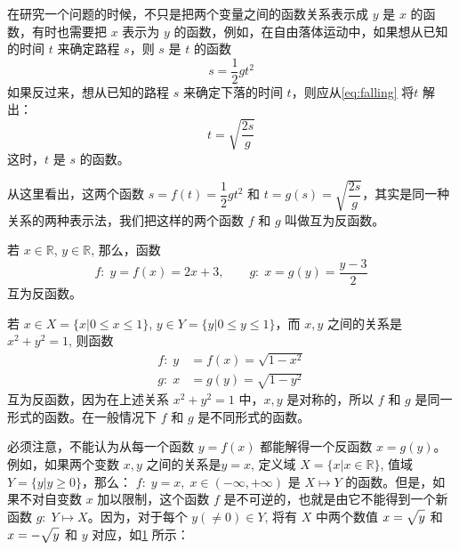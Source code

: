 在研究一个问题的时候，不只是把两个变量之间的函数关系表示成 $y$ 是 $x$ 的函数，有时也需要把 $x$ 表示为 $y$ 的函数，例如，在自由落体运动中，如果想从已知的时间 $t$ 来确定路程 $s$，则 $s$ 是 $t$ 的函数
\begin{equation}
  \label{eq:falling}
  s=\frac{1}{2}gt^2
\end{equation}
如果反过来，想从已知的路程 $s$ 来确定下落的时间 $t$，则应从\cref{eq:falling} 将$t$ 解出：
\begin{equation}
    t=\sqrt{\frac{2s}{g}}
\end{equation}
这时，$t$ 是 $s$ 的函数。

从这里看出，这两个函数 $s=f(t)=\dfrac{1}{2}gt^2$ 和 $t=g(s)=\sqrt{\dfrac{2s}{g}}$，其实是同一种关系的两种表示法，我们把这样的两个函数 $f$ 和 $g$ 叫做互为反函数。

\begin{example}
  若 $x\in\mathbb{R}$, $y\in\mathbb{R}$, 那么，函数
\[f:\; y=f(x)=2x+3,\qquad g:\; x=g(y)=\frac{y-3}{2}\]
互为反函数。
\end{example}


\begin{example}
 若 $x\in X=\{x|0\leqslant x\leqslant 1\}$, $y\in Y=\{y|0\leqslant y\leqslant 1\}$，而 $x,y$ 之间的关系是 $x^2+y^2=1$, 则函数
\[\begin{split}
  f:\; y&=f(x)=\sqrt{1-x^2}\\
g:\; x&=g(y)=\sqrt{1-y^2}   
\end{split}\]
互为反函数，因为在上述关系 $x^2+y^2=1$ 中，$x,y$ 是对称的，所以 $f$ 和 $g$ 是同一形式的函数。在一般情况下 $f$ 和 $g$ 是不同形式的函数。
\end{example}

必须注意，不能认为从每一个函数 $y=f(x)$ 都能解得一个反函数 $x=g(y)$。例如，如果两个变数 $x,y$ 之间的关系是$y=x$, 定义域 $X=\{x|x\in\mathbb{R}\}$, 值域 $Y=\{y|y\geqslant 0\}$，那么：
$f:\; y=x,\; x\in (-\infty,+\infty)$ 是 $X\mapsto Y$ 的函数。但是，如果不对自变数 $x$ 加以限制，这个函数 $f$ 是不可逆的，也就是由它不能得到一个新函数 $g:\; Y\mapsto X$。因为，对于每个 $y(\ne 0)\in Y$, 将有 $X$ 中两个数值 $x=\sqrt{\mathstrut y}$ 和$x=-\sqrt{\mathstrut y}$ 和 $y$ 对应，如\cref{fig:mapping} 所示：

\begin{figure}
    \caption{}\label{fig:mapping}
\end{figure}


